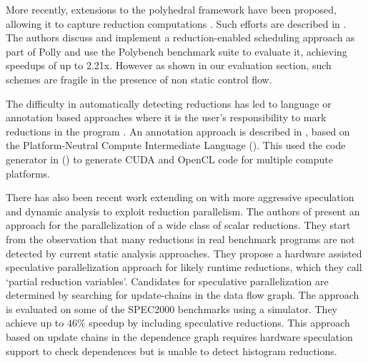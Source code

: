     More recently, extensions to the polyhedral framework have been proposed,
    allowing it to capture reduction computations
    \cite{chi1997optimizing, gupta2006simplifying, stock2014framework}.
    Such efforts are described in \cite{Doerfert2015Polly}.
    The authors discuss and implement a reduction-enabled scheduling approach as
    part of Polly and use the Polybench benchmark suite to evaluate it,
    achieving speedups of up to 2.21x.
    However as shown in our evaluation section, such schemes are fragile in the
    presence of non static control flow.

    The difficulty in automatically detecting reductions has led to language or
    annotation based approaches where it is the user's responsibility to mark
    reductions in the program \cite{deitz2002high}.
    An annotation approach is described in \cite{Reddy2016Reduction}, based on
    the Platform-Neutral Compute Intermediate Language
    (\cite{baghdadi2015PENCIL}).
    This used the code generator in
    (\cite{Verdoolaege:2013:PPC:2400682.2400713}) to generate CUDA and OpenCL
    code for multiple compute platforms.

    There has also been recent work extending on \cite{rauchwerger1999lrpd}
    with more aggressive speculation and dynamic analysis
    \cite{aguilar2015unified} to exploit reduction parallelism.
    The authors of \cite{Han2010Speculative} present an approach for the
    parallelization of a wide class of scalar reductions.
    They start from the observation that many reductions in real benchmark
    programs are not detected by current static analysis approaches.
    They propose a hardware assisted speculative parallelization approach for
    likely runtime reductions, which they call `partial reduction variables'.
    Candidates for speculative parallelization are determined by searching for
    update-chains in the data flow graph.
    The approach is evaluated on some of the SPEC2000 benchmarks using a
    simulator.
    They achieve up to $46\%$ speedup by including speculative reductions.
    This approach
    based on update chains in the dependence graph requires hardware
    speculation support to check dependences but is unable to detect
    histogram reductions.

